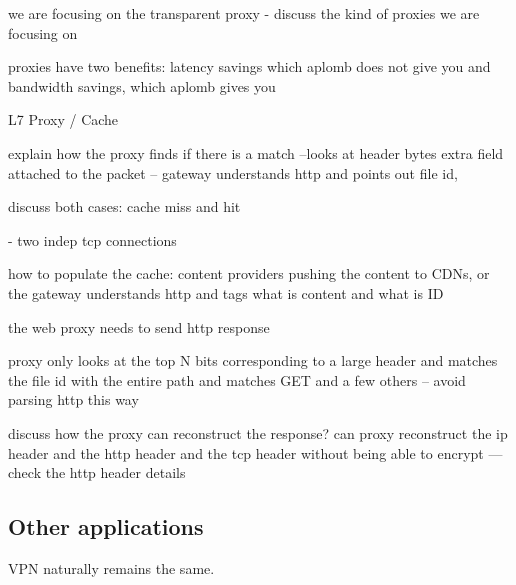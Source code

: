 we are focusing on the transparent proxy
- discuss the kind of proxies we are focusing on

proxies have two benefits: latency savings which aplomb does not give you 
and bandwidth savings, which aplomb gives you
 
L7 Proxy / Cache

explain how the proxy finds if there is  a match --looks at header bytes
extra field attached to the packet -- gateway understands http and points out file id, 

discuss both cases: cache miss and hit

- two indep tcp connections 

how to populate the cache: content providers pushing the content to CDNs, or the gateway understands
http and tags what is content and what is ID

the web proxy needs to send http response 

proxy only looks at the top N bits corresponding to a large header and matches the file id with the entire path
and matches GET and a few others -- avoid parsing http this way


discuss how the proxy can reconstruct the response?
can proxy reconstruct the ip header and the http header  and the tcp header without being able to encrypt
--- check the http header details


\subsection{Other applications}\label{sec:vpn} \label{sec:other} \label{sec:not_supp}

VPN naturally remains the same. 